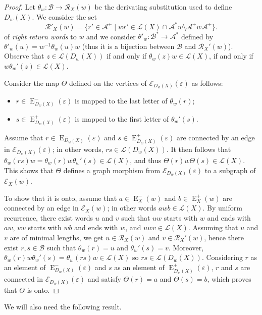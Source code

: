 \documentclass{amsart}
\newcommand*{\ret}{\mathcal{R}}
\newcommand*{\lang}{\mathcal{L}}
\newcommand*{\cA}{\mathcal{A}}
\newcommand*{\cB}{\mathcal{B}}
\newcommand*{\from}{\colon}
\newcommand*{\emptyw}{\varepsilon}
\newcommand*{\LExt}{\operatorname{E}^-}
\newcommand*{\RExt}{\operatorname{E}^+}
\newcommand*{\ExtGraph}{\mathcal{E}}
\theoremstyle{plain}
\theoremstyle{definition}
\theoremstyle{remark}
\begin{document}
\begin{proof}
    Let $\theta_w\from \cB\to\ret_X(w)$ be the derivating substitution used to define $D_w(X)$. We consider the set 
    \[
        \ret'_X(w) = \{r' \in \cA^+ \mid wr'\in \lang(X)\cap \cA^*w\setminus \cA^+w\cA^+\}.
    \]
    of \emph{right return words} to $w$ and we consider $\theta'_w\from \cB^* \to \cA^*$ defined by $\theta'_w(u) = w^{-1}\theta_w(u)w$ (thus it is a bijection between $\cB$ and $\ret_X'(w)$). Observe that $z\in\lang(D_w(X))$ if and only if $\theta_w(z)w\in\lang(X)$, if and only if $w\theta_w'(z)\in\lang(X)$.
    
    Consider the map $\Theta$ defined on the vertices of $\ExtGraph_{D_w(X)}(\varepsilon)$ as follows:
    \begin{itemize}
        \item $r\in\LExt_{D_w(X)}(\varepsilon)$ is mapped to the last letter of $\theta_w(r)$;
        \item $s\in\RExt_{D_w(X)}(\varepsilon)$ is mapped to the first letter of $\theta_w'(s)$.
    \end{itemize}
    Assume that $r\in \LExt_{D_w(X)}(\emptyw)$ and $s\in \RExt_{D_w(X)}(\emptyw)$ are connected by an edge in $\ExtGraph_{D_w(X)}(\emptyw)$; in other words, $rs\in\lang(D_w(X))$. It then follows that $\theta_w(rs)w = \theta_w(r)w\theta_w'(s)\in\lang(X)$, and thus $\Theta(r)w\Theta(s)\in\lang(X)$. This shows that $\Theta$ defines a graph morphism from $\ExtGraph_{D_w(X)}(\emptyw)$ to a subgraph of $\ExtGraph_X(w)$. 
    
    To show that it is onto, assume that $a\in\LExt_X(w)$ and $b\in\RExt_X(w)$ are connected by an edge in $\ExtGraph_{X}(w)$; in other words $awb\in\lang(X)$. By uniform recurrence, there exist words $u$ and $v$ such that $uw$ starts with $w$ and ends with $aw$, $wv$ starts with $wb$ and ends with $w$, and $uwv\in\lang(X)$. Assuming that $u$ and $v$ are of minimal lengths, we get $u\in\ret_X(w)$ and $v\in\ret_X'(w)$, hence there exist $r,s\in\cB$ such that $\theta_w(r)=u$ and $\theta_w'(s)=v$. Moreover, $\theta_w(r)w\theta_w'(s) = \theta_w(rs)w \in \lang(X)$ so $rs \in \lang(D_w(X))$. Considering $r$ as an element of $\LExt_{D_w(X)}(\emptyw)$ and $s$ as an element of $\RExt_{D_w(X)}(\emptyw)$, $r$ and $s$ are connected in $\ExtGraph_{D_w(X)}(\emptyw)$ and satisfy $\Theta(r)=a$ and $\Theta(s)=b$, which proves that $\Theta$ is onto.
\end{proof}

We will also need the following result.
\end{document}
